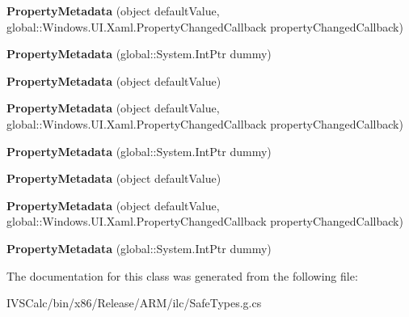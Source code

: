 \begin{DoxyCompactItemize}
\item 
\mbox{\label{class_windows_1_1_u_i_1_1_xaml_1_1_property_metadata_a467484bb1dc0b4d652be926ba6a115f2}} 
{\bfseries Property\+Metadata} (object default\+Value, global\+::\+Windows.\+U\+I.\+Xaml.\+Property\+Changed\+Callback property\+Changed\+Callback)
\item 
\mbox{\label{class_windows_1_1_u_i_1_1_xaml_1_1_property_metadata_a4f2fac6d917c0b1af18cf98789158556}} 
{\bfseries Property\+Metadata} (global\+::\+System.\+Int\+Ptr dummy)
\item 
\mbox{\label{class_windows_1_1_u_i_1_1_xaml_1_1_property_metadata_a03c8e41f83ddfc0a939dc5eb79e9c582}} 
{\bfseries Property\+Metadata} (object default\+Value)
\item 
\mbox{\label{class_windows_1_1_u_i_1_1_xaml_1_1_property_metadata_a467484bb1dc0b4d652be926ba6a115f2}} 
{\bfseries Property\+Metadata} (object default\+Value, global\+::\+Windows.\+U\+I.\+Xaml.\+Property\+Changed\+Callback property\+Changed\+Callback)
\item 
\mbox{\label{class_windows_1_1_u_i_1_1_xaml_1_1_property_metadata_a4f2fac6d917c0b1af18cf98789158556}} 
{\bfseries Property\+Metadata} (global\+::\+System.\+Int\+Ptr dummy)
\item 
\mbox{\label{class_windows_1_1_u_i_1_1_xaml_1_1_property_metadata_a03c8e41f83ddfc0a939dc5eb79e9c582}} 
{\bfseries Property\+Metadata} (object default\+Value)
\item 
\mbox{\label{class_windows_1_1_u_i_1_1_xaml_1_1_property_metadata_a467484bb1dc0b4d652be926ba6a115f2}} 
{\bfseries Property\+Metadata} (object default\+Value, global\+::\+Windows.\+U\+I.\+Xaml.\+Property\+Changed\+Callback property\+Changed\+Callback)
\item 
\mbox{\label{class_windows_1_1_u_i_1_1_xaml_1_1_property_metadata_a4f2fac6d917c0b1af18cf98789158556}} 
{\bfseries Property\+Metadata} (global\+::\+System.\+Int\+Ptr dummy)
\end{DoxyCompactItemize}


The documentation for this class was generated from the following file\+:\begin{DoxyCompactItemize}
\item 
I\+V\+S\+Calc/bin/x86/\+Release/\+A\+R\+M/ilc/Safe\+Types.\+g.\+cs\end{DoxyCompactItemize}
